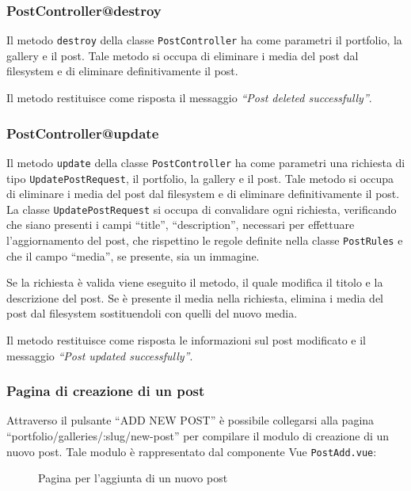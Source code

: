 \subsubsection{PostController@destroy}
Il metodo \verb|destroy| della classe \verb|PostController| ha come parametri il portfolio, la gallery e il post. Tale metodo si occupa di eliminare i media del post dal filesystem e di eliminare definitivamente il post.

Il metodo restituisce come risposta il messaggio \textit{``Post deleted successfully''}.


\subsubsection{PostController@update}
Il metodo \verb|update| della classe \verb|PostController| ha come parametri  una richiesta di tipo \verb|UpdatePostRequest|, il portfolio, la gallery e il post. Tale metodo si occupa di eliminare i media del post dal filesystem e di eliminare definitivamente il post. La classe \verb|UpdatePostRequest| si occupa di convalidare ogni richiesta, verificando che siano presenti i campi ``title'', ``description'', necessari per effettuare l'aggiornamento del post, che rispettino le regole definite nella classe \verb|PostRules| e che il campo ``media'', se presente, sia un immagine.

Se la richiesta \`e valida viene eseguito il metodo, il quale modifica il titolo e la descrizione del post. Se \`e presente il media nella richiesta, elimina i media del post dal filesystem sostituendoli con quelli del nuovo media.

Il metodo restituisce come risposta le informazioni sul post modificato e il messaggio \textit{``Post updated successfully''}.

\subsubsection{Pagina di creazione di un post}
Attraverso il pulsante ``ADD NEW POST'' \`e possibile collegarsi alla pagina ``portfolio/galleries/:slug/new-post'' per compilare il modulo di creazione di un nuovo post. Tale modulo \`e rappresentato dal componente Vue \verb|PostAdd.vue|:

\begin{figure}[htbp]
	\centering
	\fboxsep=0.5pt
	\fboxrule=0.5pt
	\caption{Pagina per l'aggiunta di un nuovo post}
	\label{fig:fig:cms-p-new}
\end{figure}

